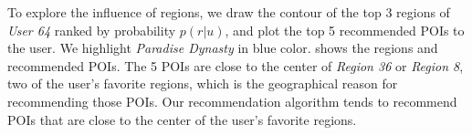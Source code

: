To explore the influence of regions, we draw the
contour of the top 3 regions of \emph{User 64} ranked by probability $p(r|u)$,
and plot the top 5 recommended POIs to the user. We highlight \emph{Paradise Dynasty}
in blue color.  shows the regions and recommended POIs.
The 5 POIs are close to the center of \emph{Region 36} or \emph{Region 8},
two of the user's favorite regions,
which is the geographical reason for recommending those POIs.
Our recommendation algorithm tends to recommend
POIs that are close to the center of the user's favorite regions.

